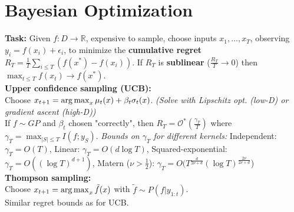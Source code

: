 \section{Bayesian Optimization}
\textbf{Task:} Given $f:D\to\mathbb{R}$, {\color{red} expensive to sample}, choose inputs $x_1,\ldots,x_T$, observing
$y_i = f(x_i) + \epsilon_i$, to minimize the \textbf{cumulative regret} $R_T = \frac{1}{T}\sum_{i\leq T}(f(x^*) - f(x_i))$. If $R_T$ is \textbf{sublinear} ($\frac{R_T}{T} \to 0$) then $\max_{t\leq T}f(x_t) \to f(x^*)$.\\
\textbf{Upper confidence sampling (UCB):}\\
Choose $x_{t+1} = \operatorname*{arg\,max}_x \mu_t(x) + \beta_t\sigma_t(x)$. \emph{(Solve with Lipschitz opt. (low-D) or gradient ascent (high-D))}\\
If $f\sim GP$ and $\beta_t$ chosen "correctly", then $R_T = \mathcal{O^*}(\frac{\gamma_T}{T})$ where $\gamma_T = \max_{|S|\leq T}I(f; y_S)$. \emph{Bounds on $\gamma_T$ for different kernels:} Independent: $\gamma_T = O(T)$, Linear: $\gamma_T = O(d\log T)$, Squared-exponential: $\gamma_T = O((\log T)^{d+1})$, Matern ($\nu>\frac{1}{2}$): $\gamma_T = O(T^{\frac{d}{2\nu+d}}{(\log T)^{\frac{2\nu}{2\nu+d}}}$)\\
\textbf{Thompson sampling:}\\
Choose $x_{t+1} = \operatorname*{arg\,max}_x \tilde{f}(x)$ with $\tilde{f} \sim P(f|y_{1:t})$.\\
Similar regret bounds as for UCB.